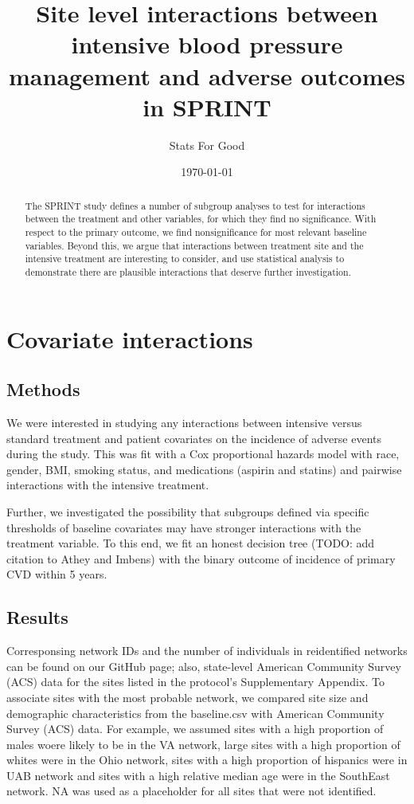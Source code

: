 \documentclass[10pt]{article}
\title{\vspace{-2em}Site level interactions between intensive blood pressure management and
  adverse outcomes in SPRINT}
\author{Stats For Good}
\date{\today}
\begin{document}
 \maketitle

\begin{abstract}
  The SPRINT study defines a number of subgroup analyses to test for
  interactions between the treatment and other variables, for which they find no
  significance. With respect to the primary outcome, we find nonsignificance
  for most relevant baseline variables. Beyond this, we argue that interactions
  between treatment site and the intensive treatment are interesting to
  consider, and use statistical analysis to demonstrate there are plausible
  interactions that deserve further investigation. 
\end{abstract}

\section{Covariate interactions}
\subsection{Methods}
We were interested in studying any interactions between intensive
versus standard treatment and patient covariates on the incidence of
adverse events during the study. This was fit with a Cox proportional
hazards model with race, gender, BMI, smoking status, and medications
(aspirin and statins) and pairwise interactions with the intensive
treatment. 

Further, we investigated the possibility that subgroups defined via specific
thresholds of baseline covariates may have stronger interactions with the
treatment variable. To this end, we fit an honest decision tree (TODO: add
citation to Athey and Imbens) with the binary outcome of incidence of primary
CVD within 5 years.

\subsection{Results}
Corresponsing network IDs and the number of individuals in reidentified networks
can be found on our GitHub page; also, state-level American Community Survey (ACS)
data for the sites listed in the protocol's Supplementary Appendix. To associate
sites with the most probable network, we compared site size and demographic
characteristics from the baseline.csv with American Community Survey
(ACS) data.  For example, we assumed sites with a high proportion of males
woere likely to be in the VA network, large sites with a high proportion of whites
were in the Ohio network, sites with a high proportion of hispanics
were in UAB network and sites with a high relative median age were in the SouthEast
network.  NA was used as a placeholder for all sites that were not identified.
\end{document}
